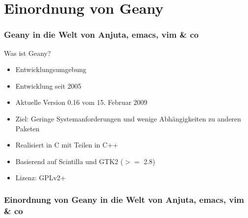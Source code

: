 \section{Einordnung von Geany}
\begin{frame}
	\frametitle{Geany in die Welt von Anjuta, emacs, vim \& co}
	\begin{block}{Was ist Geany?}
		\begin{itemize}
			\item Entwicklungsumgebung
			\item Entwicklung seit 2005
			\item Aktuelle Version 0.16 vom 15. Februar 2009
			\item Ziel: Geringe Systemanforderungen und wenige
				  Abhängigkeiten zu anderen Paketen
			\item Realisiert in C mit Teilen in C++
			\item Basierend auf Scintilla und GTK2 ($>=$ 2.8)
			\item Lizenz: GPLv2+
		\end{itemize}
	\end{block}
\end{frame}

\begin{frame}
	\frametitle{Einordnung von Geany in die Welt von Anjuta, emacs, vim \& co}
	\begin{figure}[ht]
		\centering
 		\footnotesize
		
	\end{figure}
\end{frame}
